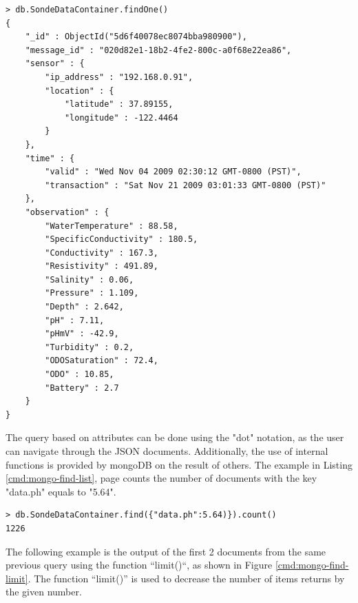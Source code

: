 \lstset{label=cmd:mongo-findone,caption=Querying the database: one item}
\begin{lstlisting}
> db.SondeDataContainer.findOne()
{
    "_id" : ObjectId("5d6f40078ec8074bba980900"),
    "message_id" : "020d82e1-18b2-4fe2-800c-a0f68e22ea86",
    "sensor" : {
        "ip_address" : "192.168.0.91",
        "location" : {
            "latitude" : 37.89155,
            "longitude" : -122.4464
        }
    },
    "time" : {
        "valid" : "Wed Nov 04 2009 02:30:12 GMT-0800 (PST)",
        "transaction" : "Sat Nov 21 2009 03:01:33 GMT-0800 (PST)"
    },
    "observation" : {
        "WaterTemperature" : 88.58,
        "SpecificConductivity" : 180.5,
        "Conductivity" : 167.3,
        "Resistivity" : 491.89,
        "Salinity" : 0.06,
        "Pressure" : 1.109,
        "Depth" : 2.642,
        "pH" : 7.11,
        "pHmV" : -42.9,
        "Turbidity" : 0.2,
        "ODOSaturation" : 72.4,
        "ODO" : 10.85,
        "Battery" : 2.7
    }
}
\end{lstlisting}

The query based on attributes can be done using the "dot" notation, as the user
can navigate through the JSON documents. Additionally, the use of internal
functions is provided by mongoDB on the result of others. The example in
Listing \ref{cmd:mongo-find-list}, page \pageref{cmd:mongo-find-list} counts
the number of documents with the key "data.ph" equals to "5.64".

\lstset{label=cmd:mongo-find-list,caption=Execution of mongo client}
\begin{lstlisting}
> db.SondeDataContainer.find({"data.ph":5.64)}).count()
1226
\end{lstlisting}

The following example is the output of the first 2 documents from the same
previous query using the function ``limit()``, as shown in Figure
\ref{cmd:mongo-find-limit}. The function ``limit()'' is used to decrease the
number of items returns by the given number.


